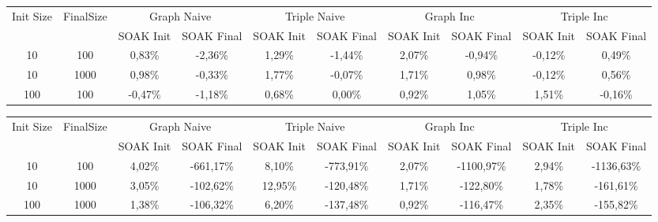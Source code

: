 \begin{sidewaystable}
	\centering
	\scriptsize
	\begin{tabular}{c|c|cc|cc|cc|cc|} %
	  	\hline
		Init Size&FinalSize &\multicolumn{2}{c}{Graph Naive}  &\multicolumn{2}{c}{Triple Naive}&\multicolumn{2}{c}{Graph Inc}  &\multicolumn{2}{c}{Triple Inc}\\\
		&& SOAK Init & SOAK Final& SOAK Init & SOAK Final& SOAK Init & SOAK Final& SOAK Init & SOAK Final\\
		\hline
		\hline
		10&100&0,83\%&	-2,36\%&	1,29\%&	-1,44\%&	2,07\%&	-0,94\%&	-0,12\%&	0,49\%\\	
		10&1000&0,98\%&	-0,33\%&	1,77\%&	-0,07\%&	1,71\%&	0,98\%&	-0,12\%&	0,56\%\\
	
		100&100&	-0,47\%&	-1,18\%&	0,68\%&	0,00\%&	0,92\%&	1,05\%&	1,51\%&	-0,16\%\\
		\hline %
	\end{tabular}
	\caption[\textsc{Analyser} Investigation Stack - Level 1 - SOAK Test Average Latency Comparison]{Mean Latency Comparison Step Response}
	\label{tab:step_latency_comparisons_mean}	

	\begin{tabular}{c|c|cc|cc|cc|cc|} %
	  	\hline
		Init Size&FinalSize &\multicolumn{2}{c}{Graph Naive}  &\multicolumn{2}{c}{Triple Naive}&\multicolumn{2}{c}{Graph Inc}  &\multicolumn{2}{c}{Triple Inc}\\\
		&& SOAK Init & SOAK Final& SOAK Init & SOAK Final& SOAK Init & SOAK Final& SOAK Init & SOAK Final\\
		\hline
		\hline
		10	&100	&4,02\%&	-661,17\%&	8,10\%&	-773,91\%&	2,07\%&	-1100,97\%&	2,94\%&	-1136,63\%\\	
		10	&1000	&3,05\%&	-102,62\%&	12,95\%&	-120,48\%&	1,71\%&	-122,80\%&	1,78\%&	-161,61\%	\\
		100	&1000&	1,38\%&	-106,32\%&	6,20\%&	-137,48\%&	0,92\%&	-116,47\%&	2,35\%&	-155,82\%	\\

		\hline %
	\end{tabular}
	\caption[\textsc{Analyser} Investigation Stack - Level 1 - SOAK Test Average Latency Comparison]{Max Latency Comparison Step Response}

	\label{tab:step_latency_comparisons_max}
	

\end{sidewaystable}
